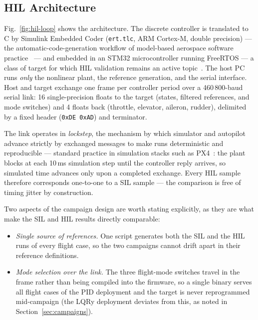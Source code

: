 \subsection{HIL Architecture}
\label{sec:hil-arch}
Fig.~\ref{fig:hil-loop} shows the architecture. The discrete controller is
translated to C by Simulink Embedded Coder (\texttt{ert.tlc}, ARM
Cortex-M, double precision) --- the automatic-code-generation workflow
of model-based aerospace software
practice~\cite{erkkinen2006automatic,erkkinen2009model} --- and
embedded in an STM32 microcontroller running FreeRTOS --- a class of
target for which HIL validation remains an active
topic~\cite{laabousse2025advanced}. The host PC runs \emph{only} the nonlinear plant, the
reference generation, and the serial interface. Host and target exchange
one frame per controller period over a 460\,800-baud serial link:
16 single-precision floats to the target (states, filtered references, and
mode switches) and 4 floats back (throttle, elevator, aileron, rudder),
delimited by a fixed header (\texttt{0xDE 0xAD}) and terminator.

The link operates in \emph{lockstep}, the mechanism by which
simulator and autopilot advance strictly by exchanged messages to make
runs deterministic and reproducible --- standard practice in
simulation stacks such as PX4~\cite{px4lockstep}: the plant blocks at
each 10\,ms simulation step until the controller reply arrives, so
simulated time advances only upon a completed exchange. Every HIL sample therefore
corresponds one-to-one to a SIL sample --- the comparison is free of
timing jitter by construction.

Two aspects of the campaign design are worth stating explicitly, as they
are what make the SIL and HIL results directly comparable:
\begin{itemize}
  \item \emph{Single source of references.} One script generates both the
        SIL and the HIL runs of every flight case, so the two campaigns
        cannot drift apart in their reference definitions.
  \item \emph{Mode selection over the link.} The three flight-mode
        switches travel in the frame rather than being compiled into the
        firmware, so a single binary serves all flight cases of the PID
        deployment and the target is never reprogrammed mid-campaign
        (the LQRy deployment deviates from this, as noted in
        Section~\ref{sec:campaigns}).
\end{itemize}

